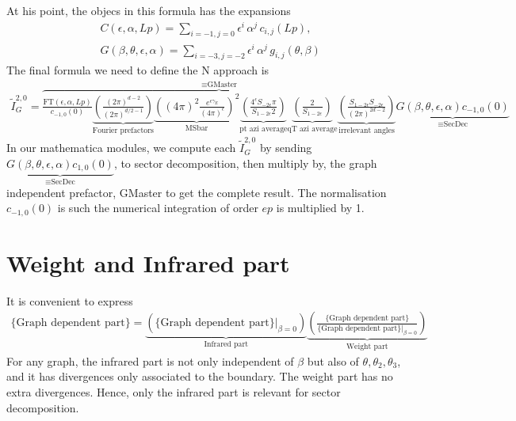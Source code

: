 \documentclass[a4paper,11pt]{article}
\numberwithin{equation}{section}
\newcommand{\eps}{\epsilon}
\begin{document}
At his point, the objecs in this formula has the expansions
\begin{align}
&C(\eps,\alpha,Lp)=\sum_{i=-1,j=0}  
\eps^i\, \alpha^j \, c_{i,j}(Lp),\\
&G (\beta,\theta,\eps,\alpha)=
\sum_{i=-3,j=-2}  
\eps^i\, \alpha^j \, g_{i,j}(\theta,\beta)
\end{align}
The final formula we need to define the N approach is
\begin{align}
\widetilde{I}_G^{2,0}=
\overbrace{
\frac{\text{FT}(\eps,\alpha,Lp)}{c_{-1,0}(0)}
\underbrace{\left( 
\frac{(2\pi)^{d-2}}{(2\pi)^{d/2-1}}\right)}_{\text{Fourier prefactors}}
\underbrace{\left( (4\pi)^2
\frac{e^{\eps \gamma_E}}{(4\pi)^\eps} \right)^2}_{\text{MSbar}}
\underbrace{\left(\frac{4^\eps S_{-2\eps}\pi}{S_{1-2\eps}2}\right)}_{\text{pt azi average}}  
\underbrace{ \left( \frac{2}{S_{1-2\eps}} \right)}_{\text{qT azi average}}
\underbrace{\left( \frac{ S_{1-2\eps}   S_{-2\eps}}{(2\pi)^{2d-2}}  \right)}_{\text{irrelevant angles}} 
}^{\equiv\text{GMaster}}
\underbrace{G (\beta,\theta,\eps,\alpha)c_{-1,0}(0)
}_{\equiv\text{SecDec}}
\end{align}
In our mathematica modules, we compute each $\widetilde{I}_G^{2,0}$ by sending $\underbrace{G (\beta,\theta,\eps,\alpha)c_{1,0}(0)}_{\equiv\text{SecDec}}$, to sector decomposition, then multiply by, the graph independent prefactor, GMaster to get the complete result. The normalisation $c_{-1,0}(0)$ is such the numerical integration of order $ep$ is multiplied by 1.

\section{Weight and Infrared part}

It is convenient to express
\begin{align}
\{\text{Graph dependent part} \}=
\underbrace{\left(\{\text{Graph dependent part} \}\vert_{\beta=0}\right)}_{\text{Infrared part}}
\underbrace{\left( \frac{\{\text{Graph dependent part} \}}{\{\text{Graph dependent part} \}\vert_{\beta=0}}\right)
}_{\text{Weight part}}
\end{align}
For any graph, the infrared part is not only independent of $\beta$ but also of $\theta,\theta_2,\theta_3 $, and it has divergences only associated to the boundary.  The weight part has no extra divergences. Hence, only the infrared part is relevant for sector decomposition.
\end{document}
